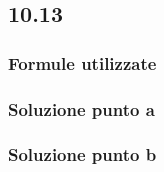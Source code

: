 \documentclass[../../main.tex]{subfiles}
\begin{document}
\subsection*{10.13}
\subsubsection*{Formule utilizzate}
\subsubsection*{Soluzione punto a}
\subsubsection*{Soluzione punto b}
\newpage
\end{document}
